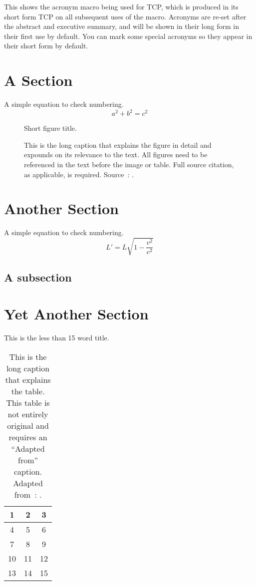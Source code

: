 This shows the acronym macro being used for \ac{TCP}, which is
produced in its short form \ac{TCP} on all subsequent uses of the macro.
Acronyms are re-set after the abstract and executive summary, and will be
shown in their long form in their first use by default. You can mark some
special acronyms so they appear in their short form by default.

\section{A Section}\label{sec:something}
A simple equation to check numbering.
\begin{equation}
a^2 + b^2 = c^2
\end{equation}
\lipsum[1-4] %

\begin{figure}
\framebox[\textwidth]{\parbox{\textwidth}{\lipsum[1]}} %
\caption[Short figure title (customized for LoF).]{Short figure title.}
\caption*{\small This is the long caption that explains the figure in detail and
expounds on its relevance to the text.
All figures need to be referenced in the text before the image or table.
Full source citation, as applicable, is required.
Source~\cite[Figure 10]{IEEEexample:article_typical}: .}
\end{figure}

\section{Another Section}
A simple equation to check numbering.
\begin{equation}
L' = {L}{\sqrt{1-\frac{v^2}{c^2}}}
\end{equation}
\lipsum[2-3] %

\subsection{A subsection}
\lipsum[5-6] %

\section{Yet Another Section}
\lipsum[1] %
\begin{table}
\caption{This is the less than 15 word title.}
\begin{center}
\begin{tabular}{ c c c }
\hline
  1 & 2 & 3 \\ \hline
  4 & 5 & 6 \\
  7 & 8 & 9 \\
  10 & 11 & 12 \\
  13 & 14 & 15 \\
\hline
\end{tabular}
\end{center}
\caption*{\small This is the long caption that explains the table.
This table is not entirely original and requires an ``Adapted from'' caption.
Adapted from~\cite[Table 5]{IEEEexample:article_typical}: .}
\end{table}
\lipsum[2]

